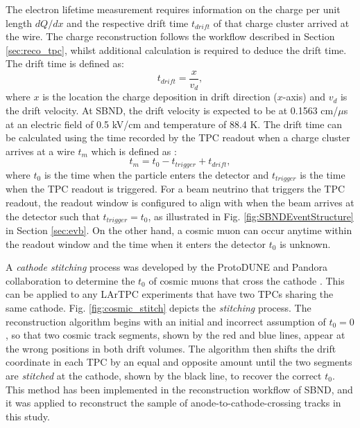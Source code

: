 The electron lifetime measurement requires information on the charge per unit length $dQ/dx$ and the respective drift time $t_{drift}$ of that charge cluster arrived at the wire.
The charge reconstruction follows the workflow described in Section \ref{sec:reco_tpc}, whilst additional calculation is required to deduce the drift time.     
The drift time is defined as:
\begin{equation}
        t_{drift} = \frac{x}{v_{d}},
\end{equation}
where $x$ is the location the charge deposition in drift direction ($x$-axis) and $v_{d}$ is the drift velocity.
At SBND, the drift velocity is expected to be at 0.1563 cm/$\mu$s at an electric field of 0.5 kV/cm and temperature of 88.4 K.
The drift time can be calculated using the time recorded by the TPC readout when a charge cluster arrives at a wire $t_{m}$ which is defined as \cite{pandora_protodune}:
\begin{equation}
\label{eq:t0}
        t_{m} = t_{0} - t_{trigger} + t_{drift},
\end{equation}
where $t_{0}$ is the time when the particle enters the detector and $t_{trigger}$ is the time when the TPC readout is triggered.
For a beam neutrino that triggers the TPC readout, the readout window is configured to align with when the beam arrives at the detector such that $t_{trigger} = t_{0}$, as illustrated in Fig. \ref{fig:SBNDEventStructure} in Section \ref{sec:evb}.
On the other hand, a cosmic muon can occur anytime within the readout window and the time when it enters the detector $t_{0}$ is unknown.

A \textit{cathode stitching} process was developed by the ProtoDUNE and Pandora collaboration to determine the $t_{0}$ of cosmic muons that cross the cathode \cite{pandora_protodune}.
This can be applied to any LArTPC experiments that have two TPCs sharing the same cathode.
Fig. \ref{fig:cosmic_stitch} depicts the \textit{stitching} process.
The reconstruction algorithm begins with an initial and incorrect assumption of $t_{0} = 0$ \cite{pandora_protodune}, so that two cosmic track segments, shown by the red and blue lines, appear at the wrong positions in both drift volumes.
The algorithm then shifts the drift coordinate in each TPC by an equal and opposite amount until the two segments are \textit{stitched} at the cathode, shown by the black line, to recover the correct $t_{0}$.
This method has been implemented in the reconstruction workflow of SBND, and it was applied to reconstruct the sample of anode-to-cathode-crossing tracks in this study.

